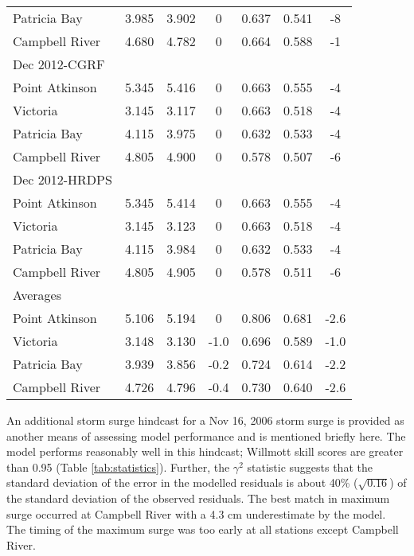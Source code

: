 \documentclass[letterpaper]{tATO2e}
\begin{document}
\begin{table}[h]
{\begin{tabular}{|l |c c c | c c c|}
Patricia Bay    & 3.985 & 3.902 & 0 & 0.637 & 0.541 & -8\\
Campbell River  & 4.680 & 4.782 & 0 & 0.664 & 0.588 & -1\\
\hline
Dec 2012-CGRF &  &  &  &  &  & \\
Point Atkinson  & 5.345 & 5.416 & 0 & 0.663 & 0.555 & -4\\
Victoria        & 3.145 & 3.117 & 0 & 0.663 & 0.518 & -4\\
Patricia Bay    & 4.115 & 3.975 & 0 & 0.632 & 0.533 & -4\\
Campbell River  & 4.805 & 4.900 & 0 & 0.578 & 0.507 & -6\\
\hline
Dec 2012-HRDPS &  &  &  &  &  & \\
Point Atkinson  & 5.345 & 5.414 & 0 & 0.663 & 0.555 & -4\\
Victoria        & 3.145 & 3.123 & 0 & 0.663 & 0.518 & -4\\
Patricia Bay    & 4.115 & 3.984 & 0 & 0.632 & 0.533 & -4\\
Campbell River  & 4.805 & 4.905 & 0 & 0.578 & 0.511 & -6\\
\hline
\hline
Averages  &  &  &  &  &  & \\
Point Atkinson & 5.106 & 5.194 & 0 & 0.806 & 0.681 & -2.6 \\
Victoria       & 3.148 & 3.130 & -1.0 & 0.696 & 0.589 & -1.0\\
Patricia Bay   & 3.939 & 3.856 & -0.2 & 0.724 & 0.614 & -2.2\\
Campbell River & 4.726 & 4.796 & -0.4 & 0.730 & 0.640 & -2.6 \\
\hline 
\end{tabular}}
\label{tab:peak}
\end{table}

An additional storm surge hindcast for a Nov 16, 2006 storm surge is provided as another means of assessing model performance and is mentioned briefly here. The model performs reasonably well in this hindcast; Willmott skill scores are greater than {\color{red}0.95} (Table \ref{tab:statistics}).  Further, the $\gamma^2$ statistic suggests that the standard deviation of the error in the modelled residuals is about 40\% ($\sqrt{0.16}$) of the standard deviation of the observed residuals. The best match in maximum surge occurred at Campbell River with a {\color{red}4.3 cm} underestimate by the model. {\color{red} The timing of the maximum surge was too early at all stations except Campbell River.} 
\end{document}
